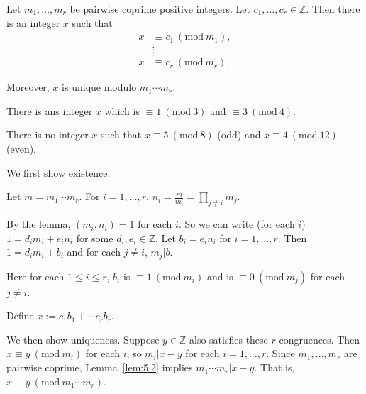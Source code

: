 \documentclass{notes}
\begin{document}
\newpage

\begin{thm}
  Let $m_1, \dots, m_r$ be pairwise coprime positive integers.
  Let $c_1, \dots, c_r \in \mathbb Z$.
  Then there is an integer $x$ such that 
  \begin{align*}
    x &\equiv c_1\ (\mathrm{mod}\ m_1), \\ 
    &\vdots \\ 
    x & \equiv c_r\ (\mathrm{mod}\ m_r).
  \end{align*}

  Moreover, $x$ is unique modulo $m_1 \cdots m_r$.
\end{thm}

\begin{eg}
  There is ans integer $x$ which is $\equiv 1\ (\mathrm{mod}\ 3)$ and $\equiv 3\ (\mathrm{mod}\ 4)$.
\end{eg}

\begin{eg}
  There is no integer $x$ such that $x \equiv 5\ (\mathrm{mod}\ 8)$ (odd) and $x \equiv 4\ (\mathrm{mod}\ 12)$ (even).
\end{eg}

\begin{prf}
  We first show existence.

  Let $m = m_1 \cdots m_r$.
  For $i = 1, \dots, r$, $n_i = \frac{m}{m_i} = \prod_{j \neq i} m_j$.

  By the lemma, $(m_i, n_i) = 1$ for each $i$.
  So we can write (for each $i$) $1 = d_i m_i + e_i n_i$ for some $d_i, e_i \in \mathbb Z$.
  Let $b_i = e_i n_i$ for $i = 1, \dots, r$.
  Then $1 = d_i m_i + b_i$ and for each $j \neq i$, $m_j \vert b$.

  Here for each $1 \leq i \leq r$, $b_i$ is $\equiv 1\ (\mathrm{mod}\ m_i)$ and is $\equiv 0\ (\mathrm{mod}\ m_j)$ for each $j \neq i$.

  Define $x := c_1 b_1 + \cdots c_r b_r$.

  We then show uniqueness.
  Suppose $y \in \mathbb Z$ also satisfies these $r$ congruences.
  Then $x \equiv y\ (\mathrm{mod}\ m_i)$ for each $i$, so $m_i \vert x - y$ for each $i = 1, \dots, r$.
  Since $m_1, \dots, m_r$ are pairwise coprime, Lemma~\ref{lem:5.2} implies $m_1 \cdots m_r \vert x - y$.
  That is, $x \equiv y\ (\mathrm{mod}\ m_1 \cdots m_r)$.
\end{prf}

\underline{}
\end{document}
